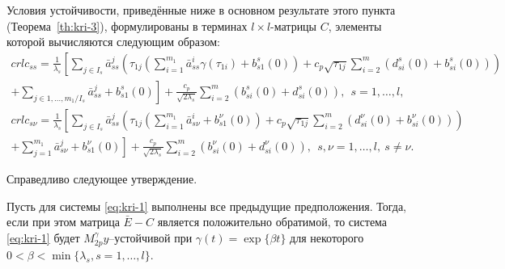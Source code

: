  Условия устойчивости, приведённые ниже в основном результате этого
пункта (Теорема~\ref{th:kri-3}), формулированы в терминах $l\times l$-матрицы
$C$, элементы которой вычисляются следующим образом:
\begin{multline*}{crl}
c_{ss} = \frac{1}{\lambda _s } \left [\sum \limits_{j \in I_s} \bar
a^{j}_{ss}\left (\tau _{1j}
 \left (\sum \limits_{i=1}^{m_1}\bar a^{i}_{ss} \gamma (\tau
 _{1i})
 + b^s_{s1}(0)\right ) +
c_p\sqrt{\tau _{1j}} \sum\limits_{i
=2}^{m}(d^s_{si}(0) + b^s_{si}(0))\right )\right .\\
\left . +\sum\limits_{j \in {1,\dots,m_1}/ I_s} \bar a^{j}_{ss} +
b^s_{s1}(0)\right ] + \frac{c_p}{\sqrt{2\lambda_s }}
\sum\limits_{i=2}^{m} (b^s_{si}(0) + d^s_{si} (0)), \ \  s =
1,\dots,l,
\end{multline*}
\begin{multline*}{crl}
c_{s\nu} = \frac{1}{\lambda _s } \left [\sum \limits_{j \in I_s}
\bar a^{j}_{ss}\left (\tau _{1j}
 \left (\sum \limits_{i=1}^{m_1}\bar a^{i}_{s\nu} + b^\nu_{s1}(0)\right ) +
c_p\sqrt{\tau _{1j}} \sum\limits_{i
=2}^{m}(d^\nu_{si}(0) + b^\nu_{si}(0))\right )\right .\\
\left . +\sum\limits_{j =1}^{m_1} \bar a^{j}_{s\nu} +
b^\nu_{s1}(0)\right ] + \frac{c_p}{\sqrt{2\lambda_s }}
\sum\limits_{i=2}^{m} (b^\nu_{si}(0) +d^\nu_{si} (0)), \ \ s,\nu =
1,\dots,l, \ s \neq \nu.
\end{multline*}

Справедливо следующее утверждение.

\begin{theorem}\label{th:kri-3}
    Пусть для системы \eqref{eq:kri-1} выполнены все
    предыдущие предположения. Тогда, если при этом матрица $\bar E - C$
    является положительно обратимой, то система \eqref{eq:kri-1} будет $M_{2p}^\gamma
    y$--устойчивой при $\gamma (t) = \exp \{\beta t\}$ для некоторого
    $0<\beta < \min \{\lambda _s, s = 1, \dots, l \}$.
\end{theorem}


